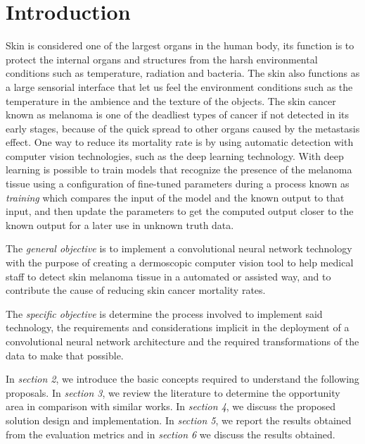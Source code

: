 \section{Introduction}
Skin is considered one of the largest organs in the human body, its function is to protect the internal organs and structures from the harsh environmental conditions such as temperature, radiation and bacteria. The skin also functions as a large sensorial interface that let us feel the environment conditions such as the temperature in the ambience and the texture of the objects.
The skin cancer known as melanoma is one of the deadliest types of cancer if not detected in its early stages, because of the quick spread to other organs caused by the metastasis effect. One way to reduce its mortality rate is by using automatic detection with computer vision technologies, such as the deep learning technology. With deep learning is possible to train models that recognize the presence of the melanoma tissue using a configuration of fine-tuned parameters during a process known as \emph{training} which compares the input of the model and the known output to that input, and then update the parameters to get the computed output closer to the known output for a later use in unknown truth data.

The \emph{general objective} is to implement a convolutional neural network technology with the purpose of creating a dermoscopic computer vision tool to help medical staff to detect skin melanoma tissue in a automated or assisted way, and to contribute the cause of reducing skin cancer mortality rates.

The \emph{specific objective} is determine the process involved to implement said technology, the requirements and considerations implicit in the deployment of a convolutional neural network architecture and the required transformations of the data to make that possible.

In \emph{section 2}, we introduce the basic concepts required to understand the following proposals. In \emph{section 3}, we review the literature to determine the opportunity area in comparison with similar works. In \emph{section 4}, we discuss the proposed solution design and implementation. In \emph{section 5}, we report the results obtained from the evaluation metrics and in \emph{section 6} we discuss the results obtained.

